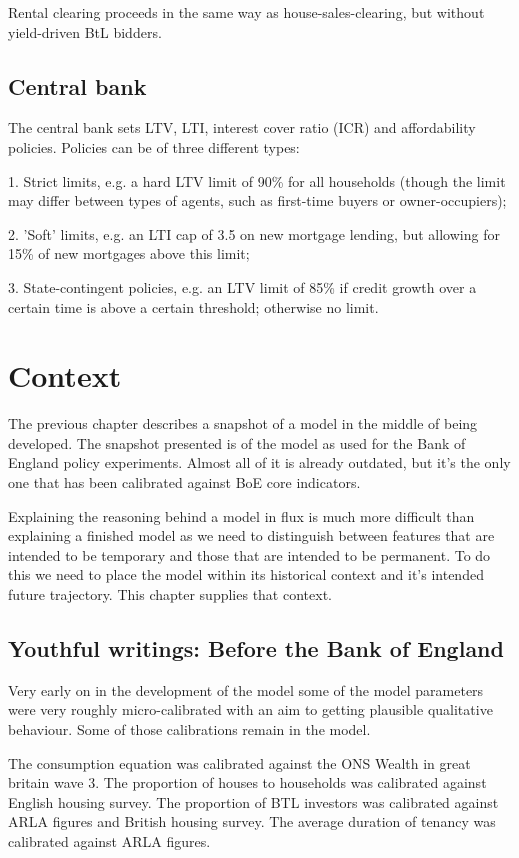 \documentclass{report}
\begin{document}
Rental clearing proceeds in the same way as house-sales-clearing, but
without yield-driven BtL bidders.\bigskip

\section{Central bank}

The central bank sets LTV, LTI, interest cover ratio (ICR) and affordability
policies. Policies can be of three different types:

1. Strict limits, e.g. a hard LTV limit of 90\% for all households (though
the limit may differ between types of agents, such as first-time buyers or
owner-occupiers);

2. 'Soft' limits, e.g. an LTI cap of 3.5 on new mortgage lending, but
allowing for 15\% of new mortgages above this limit;

3. State-contingent policies, e.g. an LTV limit of 85\% if credit growth
over a certain time is above a certain threshold; otherwise no limit.

\chapter{Context}

The previous chapter describes a snapshot of a model in the middle of being developed. The snapshot presented is of the model as used for the Bank of England policy experiments. Almost all of it is already outdated, but it's the only one that has been calibrated against BoE core indicators.

Explaining the reasoning behind a model in flux is much more difficult than explaining a finished model as we need to distinguish between features that are intended to be temporary and those that are intended to be permanent. To do this we need to place the model within its historical context and it's intended future trajectory. This chapter supplies that context.

\section{Youthful writings: Before the Bank of England}
Very early on in the development of the model some of the model parameters were very roughly micro-calibrated with an aim to getting plausible qualitative behaviour. Some of those calibrations remain in the model.

The consumption equation was calibrated against the ONS Wealth in great britain wave 3. The proportion of houses to households was calibrated against English housing survey. The proportion of BTL investors was calibrated against ARLA figures and British housing survey. The average duration of tenancy was calibrated against ARLA figures.
\end{document}
